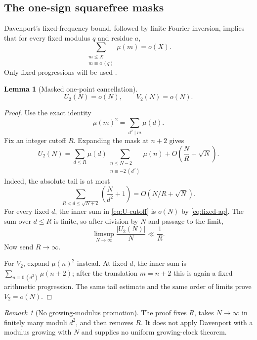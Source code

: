 \documentclass[11pt]{article}
\newtheorem{lemma}[theorem]{Lemma}
\theoremstyle{definition}
\theoremstyle{remark}
\newtheorem{remark}[theorem]{Remark}
\newcommand{\Mob}{\mu}
\begin{document}
\subsection{The one-sign squarefree masks}

Davenport's fixed-frequency bound, followed by finite Fourier inversion,
implies that for every fixed modulus $q$ and residue $a$,
\begin{equation}
                  \sum_{\substack{m\le X\\m\equiv a\ (q)}}\Mob(m)=o(X).
 \label{eq:fixed-ap}
\end{equation}
Only fixed progressions will be used \cite{Davenport1937}.

\begin{lemma}[Masked one-point cancellation]
\begin{equation}
                         U_2(N)=o(N),\qquad V_2(N)=o(N).
 \label{eq:UV-limit}
\end{equation}
\end{lemma}

\begin{proof}
Use the exact identity
\[
                         \Mob(m)^2=\sum_{d^2\mid m}\Mob(d).
\]
Fix an integer cutoff $R$.  Expanding the mask at $n+2$ gives
\begin{equation}
 U_2(N)=\sum_{d\le R}\Mob(d)
       \sum_{\substack{n\le N-2\\n\equiv-2\ (d^2)}}\Mob(n)
       +O\!\left(\frac NR+\sqrt N\right).
 \label{eq:U-cutoff}
\end{equation}
Indeed, the absolute tail is at most
\[
 \sum_{R<d\le\sqrt{N+2}}\left(\frac{N}{d^2}+1\right)
 =O(N/R+\sqrt N).
\]
For every fixed $d$, the inner sum in \eqref{eq:U-cutoff} is $o(N)$ by
\eqref{eq:fixed-ap}.  The sum over $d\le R$ is finite, so after division by
$N$ and passage to the limit,
\[
                         \limsup_{N\to\infty}\frac{|U_2(N)|}{N}
                         \ll\frac1R.
\]
Now send $R\to\infty$.

For $V_2$, expand $\Mob(n)^2$ instead.  At fixed $d$, the inner sum is
$\sum_{n\equiv0\ (d^2)}\Mob(n+2)$; after the translation $m=n+2$ this is
again a fixed arithmetic progression.  The same tail estimate and the same
order of limits prove $V_2=o(N)$.
\end{proof}

\begin{remark}[No growing-modulus promotion]
The proof fixes $R$, takes $N\to\infty$ in finitely many moduli $d^2$, and
then removes $R$.  It does not apply Davenport with a modulus growing with
$N$ and supplies no uniform growing-clock theorem.
\end{remark}
\end{document}
